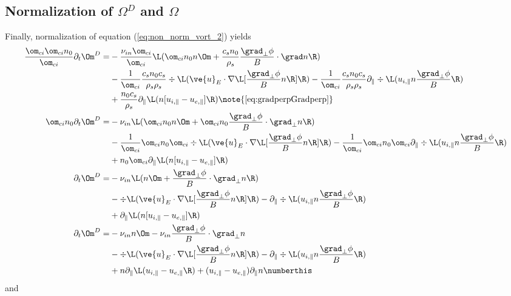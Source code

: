 \subsection{Normalization of \texorpdfstring{$\Omega^D$ and $\Omega$}{the
        vorticity}}
Finally, normalization of equation (\ref{eq:non_norm_vort_2}) yields
%
\begin{align*}
  \frac{\om_{ci}\om_{ci}n_0}{\om_{ci}}
  \partial_t \Om^D
  =&
  - \frac{\nu_{in}\om_{ci}}{\om_{ci}} \L(\om_{ci}n_0n\Om
  + \frac{c_sn_0}{\rho_s}\frac{\grad_\perp \phi}{B} \cdot \grad n\R)
  \\
  &
 - \frac{1}{\om_{ci}}
    \frac{c_sn_0c_s}{\rho_s\rho_s}
  \div
 \L(
 \ve{u}_E\cdot\nabla \L[\frac{\grad_\perp \phi}{B}n \R]
 \R)
 - \frac{1}{\om_{ci}}
    \frac{c_sn_0c_s}{\rho_s\rho_s}
\partial_\|\div \L( u_{i,\|}n \frac{\grad_\perp \phi}{B}\R)
 \\
 &
 + \frac{n_0c_s}{\rho_s}
 \partial_\| \L(n [u_{i,\|} - u_{e,\|}]\R)
 \note{\ref{eq:gradperpGradperp}}
 \\
 \om_{ci}n_0
  \partial_t \Om^D
  =&
  - \nu_{in} \L(\om_{ci}n_0n\Om
  + \om_{ci}n_0\frac{\grad_\perp \phi}{B} \cdot \grad_\perp n\R)
  \\
  &
 - \frac{1}{\om_{ci}} \om_{ci}n_0\om_{ci}
  \div
 \L(
 \ve{u}_E\cdot\nabla \L[\frac{\grad_\perp \phi}{B}n \R]
 \R)
 - \frac{1}{\om_{ci}} \om_{ci}n_0\om_{ci}
\partial_\|\div \L( u_{i,\|}n \frac{\grad_\perp \phi}{B}\R)
 \\
 &
 + n_0\om_{ci} \partial_\| \L(n [u_{i,\|} - u_{e,\|}]\R)
 \\
  \partial_t \Om^D
  =&
  - \nu_{in} \L(n\Om + \frac{\grad_\perp \phi}{B} \cdot \grad_\perp n\R)
  \\
  &
  -\div
 \L(
 \ve{u}_E\cdot\nabla \L[\frac{\grad_\perp \phi}{B}n \R]
 \R)
 -\partial_\|\div \L( u_{i,\|}n \frac{\grad_\perp \phi}{B}\R)
 \\
 &
 + \partial_\| \L(n [u_{i,\|} - u_{e,\|}]\R)
 \\
  \partial_t \Om^D
  =&
  - \nu_{in} n\Om - \nu_{in} \frac{\grad_\perp \phi}{B} \cdot \grad_\perp n
  \\
  &
  - \div \L( \ve{u}_E\cdot\nabla \L[\frac{\grad_\perp \phi}{B}n \R] \R)
  - \partial_\|\div \L( u_{i,\|}n \frac{\grad_\perp \phi}{B}\R)
 \\
 &
 + n \partial_\| \L( u_{i,\|} - u_{e,\|} \R)
 + (u_{i,\|} - u_{e,\|})\partial_\| n
 \numberthis
 \label{eq:normalized_non_boussinesq}
\end{align*}
%
and
%
